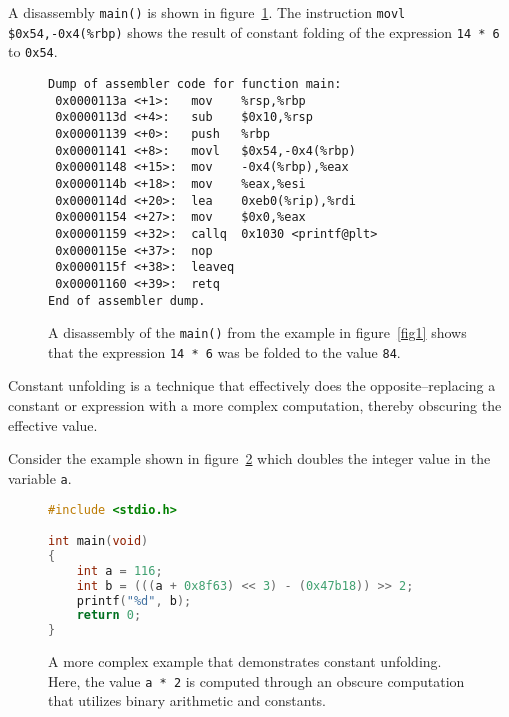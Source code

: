 \documentclass[conference]{IEEEtran}
\begin{document}
A disassembly \texttt{main()} is shown in figure~\ref{fig2}. The instruction \texttt{movl \$0x54,-0x4(\%rbp)} shows the result of constant folding of the expression \texttt{14 * 6} to \texttt{0x54}.

\begin{figure}[h]
\begin{lstlisting}[basicstyle=\footnotesize]
Dump of assembler code for function main:
 0x0000113a <+1>:   mov    %rsp,%rbp
 0x0000113d <+4>:   sub    $0x10,%rsp
 0x00001139 <+0>:   push   %rbp
 0x00001141 <+8>:   movl   $0x54,-0x4(%rbp)
 0x00001148 <+15>:  mov    -0x4(%rbp),%eax
 0x0000114b <+18>:  mov    %eax,%esi
 0x0000114d <+20>:  lea    0xeb0(%rip),%rdi
 0x00001154 <+27>:  mov    $0x0,%eax
 0x00001159 <+32>:  callq  0x1030 <printf@plt>
 0x0000115e <+37>:  nop
 0x0000115f <+38>:  leaveq 
 0x00001160 <+39>:  retq   
End of assembler dump.
\end{lstlisting}
\caption{A disassembly of the \texttt{main()} from the example in figure~\ref{fig1} shows that the expression \texttt{14 * 6} was be folded to the value \texttt{84}.}
\label{fig2}
\end{figure}

Constant unfolding is a technique that effectively does the opposite--replacing a constant or expression with a more complex computation, thereby obscuring the effective value.

Consider the example shown in figure~\ref{fig3} which doubles the integer value in the variable \texttt{a}.

\begin{figure}[h]
\begin{lstlisting}[language=C,basicstyle=\footnotesize]
#include <stdio.h>

int main(void)
{
    int a = 116;
    int b = (((a + 0x8f63) << 3) - (0x47b18)) >> 2;
    printf("%d", b);
    return 0;
}
\end{lstlisting}
\caption{A more complex example that demonstrates constant unfolding. Here, the value \texttt{a * 2} is computed through an obscure computation that utilizes binary arithmetic and constants.}
\label{fig3}
\end{figure}
\end{document}

